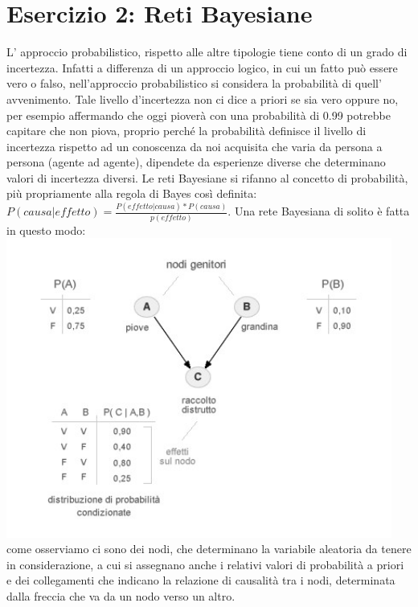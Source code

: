 		\section{Esercizio 2: Reti Bayesiane}
		\label{sec:es2}
		L' approccio probabilistico, rispetto alle altre tipologie tiene conto di un grado di incertezza. Infatti a differenza di un approccio logico, in cui un fatto può essere vero o falso, nell'approccio probabilistico si considera la probabilità di quell' avvenimento. Tale livello d'incertezza non ci dice a priori se sia vero oppure no, per esempio affermando che oggi pioverà con una probabilità di 0.99 potrebbe capitare che non piova, proprio perché la probabilità definisce il livello di incertezza rispetto ad un conoscenza da noi acquisita che varia da persona a persona (agente ad agente), dipendete da esperienze diverse che determinano valori di incertezza diversi. Le reti Bayesiane si rifanno al concetto di probabilità, più propriamente alla regola di Bayes così definita: $P(causa|effetto)=\frac{P(effetto|causa)*P(causa)}{p(effetto)}$. Una rete Bayesiana di solito è fatta in questo modo:
		\includegraphics[width=0.95\textwidth, height=0.40\textheight]{retebayesiana.jpg}
		come osserviamo ci sono dei nodi, che determinano la variabile aleatoria da tenere in considerazione, a cui si assegnano anche i relativi valori di probabilità a priori e dei collegamenti che indicano la relazione di causalità tra i nodi, determinata dalla freccia che va da un nodo verso un altro.
		\par 
